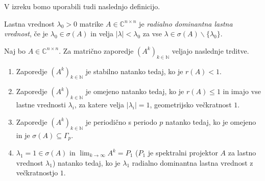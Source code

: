\documentclass[mat1]{fmfdelo}
\newcommand{\N}{\mathbb N}
\newcommand{\C}{\mathbb C}
\begin{document}
V izreku bomo uporabili tudi naslednjo definicijo.
\begin{definicija}
    Lastna vrednost $\lambda_0 > 0$ matrike $A \in \C^{n \times n}$ je \emph{radialno dominantna lastna vrednost}, če je $\lambda_0 \in \sigma(A)$ in velja $|\lambda| < \lambda_0$ za vse $\lambda \in \sigma(A) \backslash \{\lambda_0\}$.
\end{definicija}
\begin{izrek}\label{izrekAsimptotika}
    Naj bo $A \in \C^{n \times n}$. Za matrično zaporedje $(A^k)_{k\in\N}$ veljajo naslednje trditve.
    \begin{enumerate}
        \item Zaporedje $(A^k)_{k\in\N}$ je stabilno natanko tedaj, ko je $r(A) < 1$.
        \item Zaporedje $(A^k)_{k\in\N}$ je omejeno natanko tedaj, ko je $r(A) \leq 1$ in imajo vse lastne vrednosti $\lambda_i$, za katere velja $|\lambda_i| = 1$, geometrijsko večkratnost $1$.
        \item Zaporedje $(A^k)_{k\in\N}$ je periodično s periodo $p$ natanko tedaj, ko je omejeno in je $\sigma(A) \subseteq \Gamma_p$.
        \item $\lambda_1 = 1 \in \sigma(A)$ in $\lim_{k\rightarrow\infty} A^k = P_1$ ($P_1$ je spektralni projektor $A$ za lastno vrednost $\lambda_1$) natanko tedaj, ko je $\lambda_1$ radialno dominantna lastna vrednost z večkratnostjo $1$.
    \end{enumerate}
\end{izrek}
\end{document}
